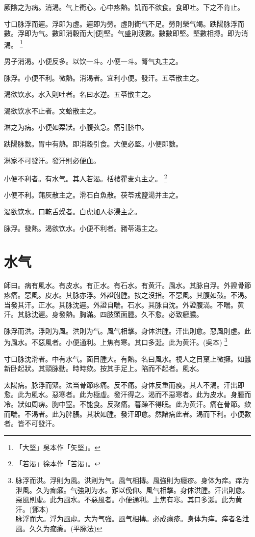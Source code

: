 \documentclass[11pt,oneside,b5paper]{ctexbook}
\begin{document}
\begin{flushleft}
厥陰之为病。消渴。气上衝心。心中疼熱。饥而不欲食。食即吐。下之不肯止。

寸口脉浮而遲。浮即为虛。遲即为勞。虛則衛气不足。勞則榮气竭。跌陽脉浮而數。浮即为气。數即消穀而大[便]堅。气盛則溲數。數數即堅。堅數相摶。即为消渴。
\footnote{「大堅」吳本作「矢堅」。}

男子消渴。小便反多。以饮一斗。小便一斗。腎气丸主之。

脉浮。小便不利。微熱。消渴者。宜利小便。發汗。五苓散主之。

渴欲饮水。水入則吐者。名曰水逆。五苓散主之。

渴欲饮水不止者。文蛤散主之。

淋之为病。小便如粟狀。小腹弦急。痛引脐中。

趺陽脉數。胃中有熱。即消穀引食。大便必堅。小便即數。

淋家不可發汗。發汗則必便血。

小便不利者。有水气。其人若渴。栝樓瞿麦丸主之。
\footnote{「若渴」徐本作「苦渴」。}

小便不利。蒲灰散主之。滑石白魚散。茯苓戎鹽湯并主之。

渴欲饮水。口乾舌燥者。白虎加人参湯主之。

脉浮。發熱。渴欲饮水。小便不利者。豬苓湯主之。

\chapter{水气}

師曰。病有風水。有皮水。有正水。有石水。有黄汗。風水。其脉自浮。外證骨節疼痛。惡風。皮水。其脉亦浮。外證胕腫。按之沒指。不惡風。其腹如鼓。不渴。当發其汗。正水。其脉沈遲。外證自喘。石水。其脉自沈。外證腹滿。不喘。黄汗。其脉沈遲。身發熱。胸滿。四肢頭面腫。久不愈。必致癰膿。

脉浮而洪。浮則为風。洪則为气。風气相擊。身体洪腫。汗出則愈。惡風則虛。此为風水。不惡風者。小便通利。上焦有寒。其口多涎。此为黄汗。(吳本)
\footnote{脉浮而洪。浮則为風。洪則为气。風气相摶。風強則为癮疹。身体为痒。痒为泄風。久为痂癩。气強則为水。難以俛仰。風气相擊。身体洪腫。汗出則愈。惡風則虛。此为風水。不惡風者。小便通利。上焦有寒。其口多涎。此为黄汗。(鄧本)\\脉浮而大。浮为風虛。大为气強。風气相摶。必成癮疹。身体为痒。痒者名泄風。久久为痂癩。(平脉法)}

寸口脉沈滑者。中有水气。面目腫大。有熱。名曰風水。視人之目窠上微擁。如蠶新卧起狀。其頸脉動。時時欬。按其手足上。陷而不起者。風水。

太陽病。脉浮而緊。法当骨節疼痛。反不痛。身体反重而痠。其人不渴。汗出即愈。此为風水。惡寒者。此为極虛。發汗得之。渴而不惡寒者。此为皮水。身腫而冷。狀如周痹。胸中窒。不能食。反聚痛。暮躁不得眠。此为黄汗。痛在骨節。欬而喘。不渴者。此为脾脹。其狀如腫。發汗即愈。然諸病此者。渴而下利。小便數者。皆不可發汗。


\end{flushleft}
\end{document}
